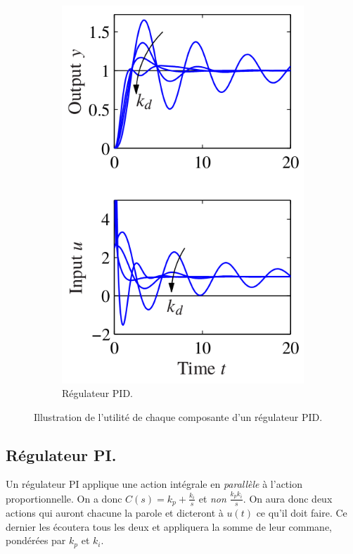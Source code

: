 \begin{figure}
\begin{subfigure}{0.3\linewidth}
    \includegraphics[width=\linewidth]{pid.png}
    \caption{Régulateur PID\cite{astrom2010feedback}.}
    \label{fig:pid}
  \end{subfigure}
  \caption{Illustration de l'utilité de chaque composante
  d'un régulateur PID.}
\end{figure}

\subsection{Régulateur PI.}
Un régulateur PI applique une action intégrale en \emph{parallèle} à l'action
proportionnelle.
On a donc $C(s) = k_p + \frac{k_i}{s}$ et \emph{non} $\frac{k_pk_i}{s}$.
On aura donc deux actions qui auront chacune la parole et dicteront à $u(t)$ ce
qu'il doit faire. Ce dernier les écoutera tous les deux et appliquera la somme
de leur commane, pondérées par $k_p$ et $k_i$.

